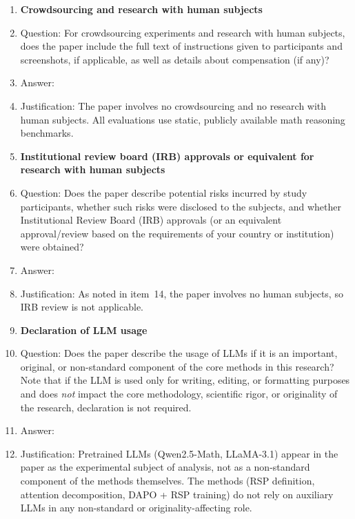 \begin{enumerate}
\item {\bf Crowdsourcing and research with human subjects}
    \item[] Question: For crowdsourcing experiments and research with human subjects, does the paper include the full text of instructions given to participants and screenshots, if applicable, as well as details about compensation (if any)?
    \item[] Answer: \answerNA{}
    \item[] Justification: The paper involves no crowdsourcing and no research with human subjects. All evaluations use static, publicly available math reasoning benchmarks.

\item {\bf Institutional review board (IRB) approvals or equivalent for research with human subjects}
    \item[] Question: Does the paper describe potential risks incurred by study participants, whether such risks were disclosed to the subjects, and whether Institutional Review Board (IRB) approvals (or an equivalent approval/review based on the requirements of your country or institution) were obtained?
    \item[] Answer: \answerNA{}
    \item[] Justification: As noted in item~14, the paper involves no human subjects, so IRB review is not applicable.

\item {\bf Declaration of LLM usage}
    \item[] Question: Does the paper describe the usage of LLMs if it is an important, original, or non-standard component of the core methods in this research? Note that if the LLM is used only for writing, editing, or formatting purposes and does \emph{not} impact the core methodology, scientific rigor, or originality of the research, declaration is not required.
    \item[] Answer: \answerNA{}
    \item[] Justification: Pretrained LLMs (Qwen2.5-Math, LLaMA-3.1) appear in the paper as the experimental subject of analysis, not as a non-standard component of the methods themselves. The methods (RSP definition, attention decomposition, DAPO + RSP training) do not rely on auxiliary LLMs in any non-standard or originality-affecting role.

\end{enumerate}
